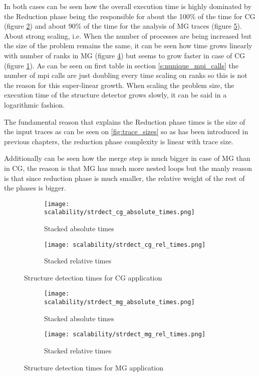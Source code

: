 In both cases can be seen how the overall execution time is highly dominated
by the Reduction phase being the responsible for about the 100\% of the time for
CG (figure \ref{fig:cg_stdrec_rel}) and about 90\% of the time for the analysis
of MG traces (figure \ref{fig:mg_stdrec_rel}). 
About strong scaling, i.e. When the number of processes are being
increased but the size of the problem remains the same, it can be seen
how time grows linearly with number of ranks in MG
(figure \ref{fig:mg_strdec_abs}) but seems to grow faster in case of CG (figure
\ref{fig:cg_strdec_abs}). As can be seen on first table in section \ref{s:nunique_mpi_calls} the
number of mpi calls are just doubling every time scaling on ranks so this is not
the reason for this super-linear growth. 
When scaling the problem size, the execution time of the
structure detector grows slowly, it can be said in a logarithmic fashion. 

The fundamental reason that explains the Reduction phase times is the size of
the input traces as can be seen on \ref{fig:trace_sizes} so as has been
introduced in previous chapters, the reduction phase complexity is linear with 
trace size.

Additionally can be seen how the merge step is much bigger in case of MG than in
CG, the reason is that MG has much more nested loops but the manly reason is
that since reduction phase is much smaller, the relative weight of the rest of
the phases is bigger.

\begin{figure}
    \centering
    \begin{subfigure}[b]{0.45\textwidth}
        \texttt{[image: scalability/strdect\_cg\_absolute\_times.png]}
        \caption{Stacked absolute times}
        \label{fig:cg_strdec_abs}
    \end{subfigure}
    \medspace
    \begin{subfigure}[b]{0.45\textwidth}
        \texttt{[image: scalability/strdect\_cg\_rel\_times.png]}
        \caption{Stacked relative times}
        \label{fig:cg_stdrec_rel}
    \end{subfigure}
    \caption{Structure detection times for CG application}
    \label{fig:scalability_results_cg}
\end{figure}

\begin{figure}
    \centering
    \begin{subfigure}[b]{0.45\textwidth}
        \texttt{[image: scalability/strdect\_mg\_absolute\_times.png]}
        \caption{Stacked absolute times}
        \label{fig:mg_strdec_abs}
    \end{subfigure}
    \medspace
    \begin{subfigure}[b]{0.45\textwidth}
        \texttt{[image: scalability/strdect\_mg\_rel\_times.png]}
        \caption{Stacked relative times}
        \label{fig:mg_stdrec_rel}
    \end{subfigure}
    \caption{Structure detection times for MG application}
    \label{fig:scalability_results_mg}
\end{figure}

